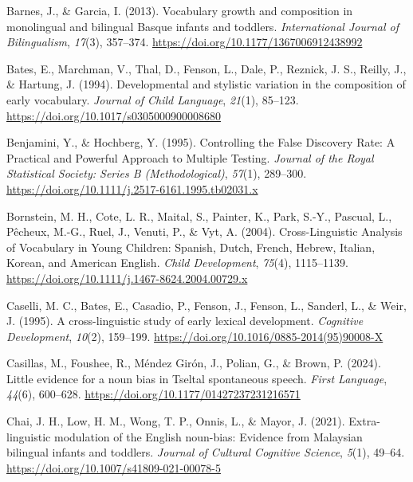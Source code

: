 \documentclass[10pt, letterpaper]{article}
\begin{document}
\label{refs}
\begin{CSLReferences}{1}{0}
Barnes, J., \& Garcia, I. (2013). Vocabulary growth and composition in
monolingual and bilingual {Basque} infants and toddlers.
\emph{International Journal of Bilingualism}, \emph{17}(3), 357--374.
\url{https://doi.org/10.1177/1367006912438992}

Bates, E., Marchman, V., Thal, D., Fenson, L., Dale, P., Reznick, J. S.,
Reilly, J., \& Hartung, J. (1994). Developmental and stylistic variation
in the composition of early vocabulary. \emph{Journal of Child
Language}, \emph{21}(1), 85--123.
\url{https://doi.org/10.1017/s0305000900008680}

Benjamini, Y., \& Hochberg, Y. (1995). Controlling the {False Discovery
Rate}: {A Practical} and {Powerful Approach} to {Multiple Testing}.
\emph{Journal of the Royal Statistical Society: Series B
(Methodological)}, \emph{57}(1), 289--300.
\url{https://doi.org/10.1111/j.2517-6161.1995.tb02031.x}

Bornstein, M. H., Cote, L. R., Maital, S., Painter, K., Park, S.-Y.,
Pascual, L., Pêcheux, M.-G., Ruel, J., Venuti, P., \& Vyt, A. (2004).
Cross-{Linguistic Analysis} of {Vocabulary} in {Young Children}:
{Spanish}, {Dutch}, {French}, {Hebrew}, {Italian}, {Korean}, and
{American English}. \emph{Child Development}, \emph{75}(4), 1115--1139.
\url{https://doi.org/10.1111/j.1467-8624.2004.00729.x}

Caselli, M. C., Bates, E., Casadio, P., Fenson, J., Fenson, L., Sanderl,
L., \& Weir, J. (1995). A cross-linguistic study of early lexical
development. \emph{Cognitive Development}, \emph{10}(2), 159--199.
\url{https://doi.org/10.1016/0885-2014(95)90008-X}

Casillas, M., Foushee, R., Méndez Girón, J., Polian, G., \& Brown, P.
(2024). Little evidence for a noun bias in {Tseltal} spontaneous speech.
\emph{First Language}, \emph{44}(6), 600--628.
\url{https://doi.org/10.1177/01427237231216571}

Chai, J. H., Low, H. M., Wong, T. P., Onnis, L., \& Mayor, J. (2021).
Extra-linguistic modulation of the {English} noun-bias: Evidence from
{Malaysian} bilingual infants and toddlers. \emph{Journal of Cultural
Cognitive Science}, \emph{5}(1), 49--64.
\url{https://doi.org/10.1007/s41809-021-00078-5}


\end{CSLReferences}
\end{document}
